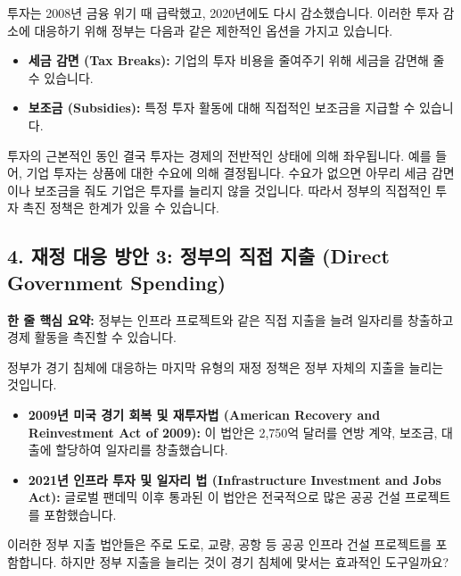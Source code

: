 \documentclass[11pt,a4paper]{book}
\theoremstyle{definition}
\begin{document}
투자는 2008년 금융 위기 때 급락했고, 2020년에도 다시 감소했습니다. 이러한 투자 감소에 대응하기 위해 정부는 다음과 같은 제한적인 옵션을 가지고 있습니다.

\begin{itemize}
    \item \textbf{세금 감면 (Tax Breaks):} 기업의 투자 비용을 줄여주기 위해 세금을 감면해 줄 수 있습니다.
    \item \textbf{보조금 (Subsidies):} 특정 투자 활동에 대해 직접적인 보조금을 지급할 수 있습니다.
\end{itemize}

\begin{cautionbox}{투자의 근본적인 동인}
    결국 투자는 경제의 전반적인 상태에 의해 좌우됩니다. 예를 들어, 기업 투자는 상품에 대한 수요에 의해 결정됩니다. 수요가 없으면 아무리 세금 감면이나 보조금을 줘도 기업은 투자를 늘리지 않을 것입니다. 따라서 정부의 직접적인 투자 촉진 정책은 한계가 있을 수 있습니다.
\end{cautionbox}

\subsection{4. 재정 대응 방안 3: 정부의 직접 지출 (Direct Government Spending)}

\begin{tcolorbox}[mybox={정부 지출의 역할}]
    \textbf{한 줄 핵심 요약:} 정부는 인프라 프로젝트와 같은 직접 지출을 늘려 일자리를 창출하고 경제 활동을 촉진할 수 있습니다.
\end{tcolorbox}

정부가 경기 침체에 대응하는 마지막 유형의 재정 정책은 정부 자체의 지출을 늘리는 것입니다.

\begin{examplebox}[title={예시: 미국 정부의 직접 지출 프로그램}]
    \begin{itemize}
        \item \textbf{2009년 미국 경기 회복 및 재투자법 (American Recovery and Reinvestment Act of 2009):} 이 법안은 2,750억 달러를 연방 계약, 보조금, 대출에 할당하여 일자리를 창출했습니다.
        \item \textbf{2021년 인프라 투자 및 일자리 법 (Infrastructure Investment and Jobs Act):} 글로벌 팬데믹 이후 통과된 이 법안은 전국적으로 많은 공공 건설 프로젝트를 포함했습니다.
    \end{itemize}
\end{examplebox}

이러한 정부 지출 법안들은 주로 도로, 교량, 공항 등 공공 인프라 건설 프로젝트를 포함합니다. 하지만 정부 지출을 늘리는 것이 경기 침체에 맞서는 효과적인 도구일까요?
\end{document}
